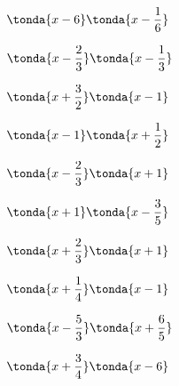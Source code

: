 \begin{esercizio}
\begin{htmulticols}{3}
\begin{enumeratea}
\item \(\tonda{x - 6}\tonda{x - \dfrac{1}{6}}\) %
\item \(\tonda{x - \dfrac{2}{3}}\tonda{x - \dfrac{1}{3}}\) %
\item \(\tonda{x + \dfrac{3}{2}}\tonda{x - 1}\) %
\item \(\tonda{x - 1}\tonda{x + \dfrac{1}{2}}\) %
\item \(\tonda{x - \dfrac{2}{3}}\tonda{x + 1}\) %
\item \(\tonda{x + 1}\tonda{x - \dfrac{3}{5}}\) %
\item \(\tonda{x + \dfrac{2}{3}}\tonda{x + 1}\) %
\item \(\tonda{x + \dfrac{1}{4}}\tonda{x - 1}\) %
\item \(\tonda{x - \dfrac{5}{3}}\tonda{x + \dfrac{6}{5}}\) %
\item \(\tonda{x + \dfrac{3}{4}}\tonda{x - 6}\) %

\end{enumeratea}
\end{htmulticols}
\end{esercizio}
